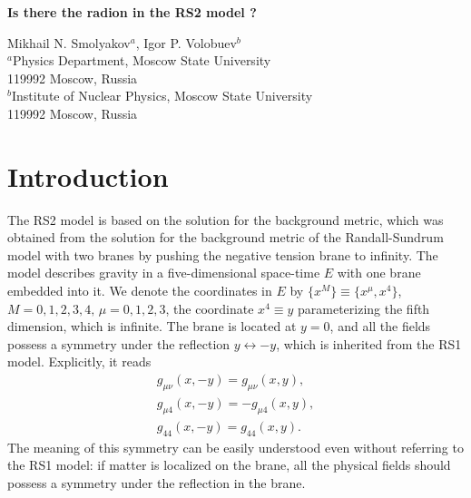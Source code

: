 \documentclass[a4paper,12pt]{article}
\begin{document}
\begin{center}
 
\vspace{1cm}

{\LARGE\bf Is there the radion in the RS2 model ?} \vspace{4mm}

{Mikhail N. Smolyakov$^{a}$, Igor P. Volobuev$^{b}$\\ \vspace{2mm}
$^a$Physics Department, Moscow State University
\\ 119992 Moscow, Russia \\ $^{b}$Institute of Nuclear Physics,
Moscow State University \\ 119992  Moscow, Russia }

\end{center}

\begin{abstract}{We analyse the physical boundary conditions at infinity
for metric fluctuations and  gauge functions in the RS2 model with matter
on the brane. We argue that due to these boundary conditions the radion
field cannot be gauged out in this case. Thus, it represents a physical
degree of freedom of the model.}
\end{abstract}


\section{Introduction}
The RS2 model \cite{RS2}  is based on the solution for the background
metric, which was obtained from the solution for the background metric of
the Randall-Sundrum model with two branes \cite{RS1} by pushing the
negative tension brane to infinity. The model  describes  gravity in a
five-dimensional space-time $E$ with one brane embedded into it. We denote
the coordinates  in $E$ by $\{ x^M\} \equiv \{x^{\mu},x^4\}$, $M=
0,1,2,3,4, \, \mu=0,1,2,3$, the coordinate $x^4 \equiv y$ parameterizing
the fifth dimension, which is infinite. The brane is located at $y=0$, and
all the fields possess a symmetry  under the reflection $y\leftrightarrow-y$,
which is inherited from the RS1 model. Explicitly,  it reads
\begin{eqnarray}
\label{orbifoldsym}
 g_{\mu \nu}(x,- y)=  g_{\mu \nu}(x,  y), \\
 \nonumber
  g_{\mu 4}(x,- y)= - g_{\mu 4}(x,  y), \\ \nonumber
   g_{44}(x,- y)=  g_{44}(x,  y).
\end{eqnarray}
The meaning  of this symmetry can  be  easily understood even without
referring to the RS1 model: if matter is localized on the brane, all the
physical fields should possess a symmetry  under the reflection in the
brane.
\end{document}
